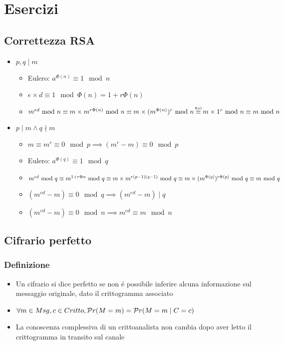\chapter{Esercizi}

\section{Correttezza RSA}

\begin{itemize}
    \item $p, q \mid m$
    \begin{itemize}
        \item Eulero: $a^{\Phi(n)} \equiv 1 \mod{n}$
        \item $e \times d \equiv 1 \mod{\Phi(n)} = 1 + r\Phi(n)$
        \item $m^{ed} \mod{n} \equiv m \times m^{r\Phi(n)} \mod{n} \equiv m \times (m^{\Phi(n)})^r \mod{n} \\\dequiv{Eul} m \times 1^r \mod{n} \equiv m \mod{n}$
    \end{itemize}
    \item $p \mid m \wedge q \nmid m$
    \begin{itemize}
        \item $m \equiv m^r \equiv 0 \mod{p} \implies (m^r - m) \equiv 0 \mod{p}$
        \item Eulero: $a^{\Phi(q)} \equiv 1 \mod{q}$
        \item $m^{ed} \mod{q} \equiv m^{1+r\Phi{n}} \mod{q} \equiv m \times m^{r(p-1)(q-1)} \mod{q} \\\equiv m \times (m^{\Phi(q)})^{r\Phi(p)} \mod{q} \equiv m \mod{q}$
        \item $(m^{ed} - m) \equiv 0 \mod{q} \implies (m^{ed} - m) \mid q$
        \item $(m^{ed} - m) \equiv 0 \mod{n} \implies m^{ed} \equiv m \mod{n}$
    \end{itemize}
\end{itemize}

\section{Cifrario perfetto}

\subsection{Definizione}

\begin{itemize}
    \item Un cifrario si dice perfetto se non \'e possibile inferire alcuna informazione sul messaggio originale, dato il crittogramma associato
    \item $\forall m \in Msg, c \in Critto, \pr(M = m) = \pr(M = m \mid C = c)$
    \item La conoscenza complessiva di un crittoanalista non cambia dopo aver letto il crittogramma in transito sul canale
\end{itemize}

